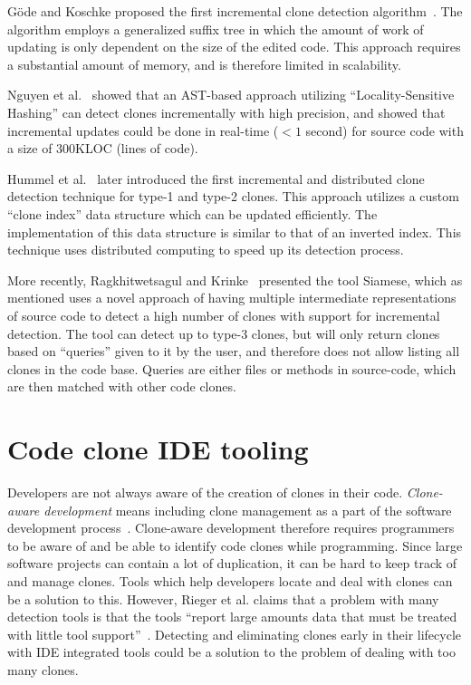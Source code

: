 Göde and Koschke proposed the first incremental clone detection
algorithm~\cite{GodeIncrementalCloneDetection}. The algorithm employs a generalized suffix
tree in which the amount of work of updating is only dependent on the size of the edited
code. This approach requires a substantial amount of memory, and is therefore limited in
scalability.

Nguyen et al.~\cite{LocalitySensitiveHashingIncremental} showed that an AST-based approach
utilizing ``Locality-Sensitive Hashing'' can detect clones incrementally with high
precision, and showed that incremental updates could be done in real-time ($< 1$ second)
for source code with a size of 300KLOC (lines of code).

Hummel et al.~\cite{IndexBasedIncrementalCloneDetection} later introduced the first
incremental and distributed clone detection technique for type-1 and type-2 clones. This
approach utilizes a custom ``clone index'' data structure which can be updated
efficiently. The implementation of this data structure is similar to that of an inverted
index. This technique uses distributed computing to speed up its detection process.

More recently, Ragkhitwetsagul and Krinke~\cite{SiameseScalableAndIncrementalClone}
presented the tool Siamese, which as mentioned uses a novel approach of having multiple
intermediate representations of source code to detect a high number of clones with support
for incremental detection. The tool can detect up to type-3 clones, but will only return
clones based on ``queries'' given to it by the user, and therefore does not allow listing
all clones in the code base. Queries are either files or methods in source-code, which are
then matched with other code clones.

\section{Code clone IDE tooling}

Developers are not always aware of the creation of clones in their code. \emph{Clone-aware
development} means including clone management as a part of the software development
process~\cite{Zibran_real_time_search}. Clone-aware development therefore requires
programmers to be aware of and be able to identify code clones while programming. Since
large software projects can contain a lot of duplication, it can be hard to keep track of
and manage clones. Tools which help developers locate and deal with clones can be a
solution to this. However, Rieger et al. claims that a problem with many detection
tools is that the tools ``report large amounts data that must be treated with little tool
support''~\cite[1]{InsightsSystemWideDuplication}. Detecting and eliminating clones early
in their lifecycle with IDE integrated tools could be a solution to the problem of dealing
with too many clones.

